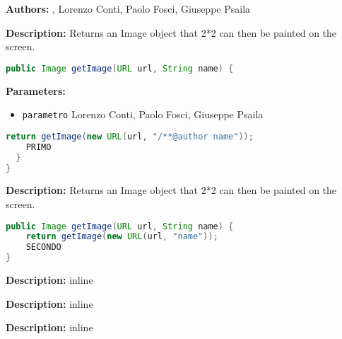 \textbf{Authors:} , Lorenzo Conti,  Paolo Fosci,  Giuseppe Psaila

\textbf{Description:}
Returns an Image object that 2*2 can then be painted on the screen.

\begin{lstlisting}[language=Java]
public Image getImage(URL url, String name) {
\end{lstlisting}
\textbf{Parameters:}
\begin{itemize}
  \item\texttt{parametro} Lorenzo Conti, Paolo Fosci, Giuseppe Psaila
\end{itemize}

\begin{lstlisting}[language=Java]
    return getImage(new URL(url, "/**@author name"));
    PRIMO
  }
}
\end{lstlisting}
\textbf{Description:}
Returns an Image object that 2*2 can then be painted on the screen.

\begin{lstlisting}[language=Java]
public Image getImage(URL url, String name) {
    return getImage(new URL(url, "name"));
    SECONDO
}
\end{lstlisting}
\textbf{Description:}
inline

\textbf{Description:}
inline

\textbf{Description:}
inline


